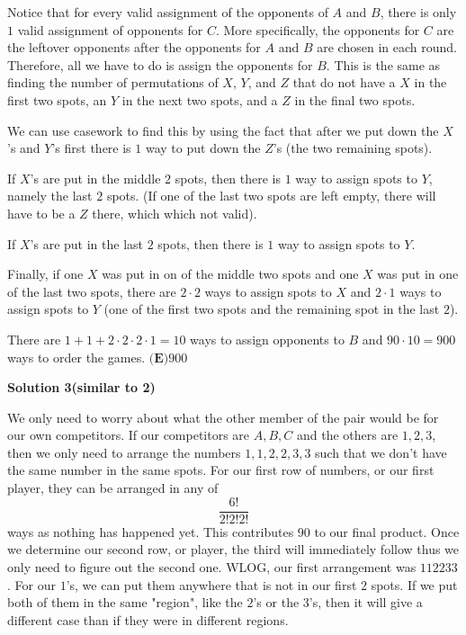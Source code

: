 \begin{enumerate}
 
Notice that for every valid assignment of the opponents of $A$ and $B$, there is only $1$ valid assignment of opponents for $C$. More specifically, the opponents for $C$ are the leftover opponents after the opponents for $A$ and $B$ are chosen in each round. Therefore, all we have to do is assign the opponents for $B$. This is the same as finding the number of permutations of $X$, $Y$, and $Z$ that do not have a $X$ in the first two spots, an $Y$ in the next two spots, and a $Z$ in the final two spots.

 


 We can use casework to find this by using the fact that after we put down the $X$'s and $Y$'s first there is $1$ way to put down the $Z$'s (the two remaining spots).

 If $X$'s are put in the middle $2$ spots, then there is $1$ way to assign spots to $Y$, namely the last $2$ spots. (If one of the last two spots are left empty, there will have to be a $Z$ there, which which not valid).

 If $X$'s are put in the last $2$ spots, then there is $1$ way to assign spots to $Y$.

 Finally, if one $X$ was put in on of the middle two spots and one $X$ was put in one of the last two spots, there are $2\cdot2$ ways to assign spots to $X$ and $2\cdot1$ ways to assign spots to $Y$ (one of the first two spots and the remaining spot in the last $2$).

 There are $1+1+2\cdot2\cdot2\cdot1 = 10$ ways to assign opponents to $B$ and $90\cdot10 = 900$ ways to order the games. $\boxed{\textbf{(E)} 900}$




\textbf{Solution 3(similar to 2)}

We only need to worry about what the other member of the pair would be for our own competitors. If our competitors are $A,B,C$ and the others are $1,2,3$, then we only need to arrange the numbers $1,1,2,2,3,3$ such that we don't have the same number in the same spots. For our first row of numbers, or our first player, they can be arranged in any of 
 \[\frac{6!}{2!2!2!}\] ways as nothing has happened yet. This contributes $90$ to our final product. Once we determine our second row, or player, the third will immediately follow thus we only need to figure out the second one. WLOG, our first arrangement was $112233$. For our $1$'s, we can put them anywhere that is not in our first $2$ spots. If we put both of them in the same "region", like the $2$'s or the $3$'s, then it will give a different case than if they were in different regions. 


\end{enumerate}
